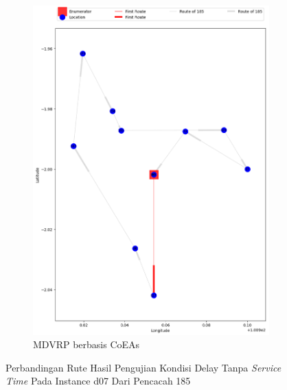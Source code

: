 \begin{figure}[H]
	\centering
	\begin{subfigure}[t]{\textwidth}
		\centering
		\includegraphics[width=\textwidth]{Resources/Images/delayed_7/real_m15_n100_delayed_7_185_coes}
		\caption{MDVRP berbasis CoEAs}
		\label{fig:real_m15_n100_delayed_7_185_coes}
	\end{subfigure}
	\caption{Perbandingan Rute Hasil Pengujian Kondisi Delay Tanpa \textit{Service Time} Pada Instance d07 Dari Pencacah 185}
	\label{fig:real_m15_n100_delayed_7_185}
\end{figure}


